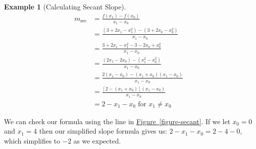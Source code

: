 \documentclass[12pt,]{book}
\theoremstyle{plain}
\theoremstyle{definition}
\theoremstyle{definition}
\theoremstyle{definition}
\newtheorem{example}[theorem]{Example}
\theoremstyle{definition}
\theoremstyle{definition}
\numberwithin{equation}{section}
\newcommand{\fe}[2]{#1\mathopen{}\left(#2\right)\mathclose{}}
\begin{document}
\begin{example}[Calculating Secant Slope]\label{example-secant}
\begin{align*}
m_{\text{sec}}&=\frac{\fe{f}{x_1}-\fe{f}{x_0}}{x_1-x_0}\\
&=\frac{\left(3+2x_1-x_1^2\right)-\left(3+2x_0-x_0^2\right)}{x_1-x_0}\\
&=\frac{3+2x_1-x_1^2-3-2x_0+x_0^2}{x_1-x_0}\\
&=\frac{\left(2x_1-2x_0\right)-\left(x_1^2-x_0^2\right)}{x_1-x_0}\\
&=\frac{2\left(x_1-x_0\right)-\left(x_1+x_0\right)\left(x_1-x_0\right)}{x_1-x_0}\\
&=\frac{\left[2-\left(x_1+x_0\right)\right]\left(x_1-x_0\right)}{x_1-x_0}\\
&=2-x_1-x_0\text{ for }x_1\neq x_0
\end{align*}%
\par
We can check our formula using the line in \hyperref[figure-secant]{Figure~\ref{figure-secant}}. If we let \(x_0=0\) and \(x_1=4\) then our simplified slope formula gives us: \(2-x_1-x_0=2-4-0\), which simplifies to \(-2\) as we expected.%
\end{example}
\typeout{************************************************}
\typeout{************************************************}
\end{document}
